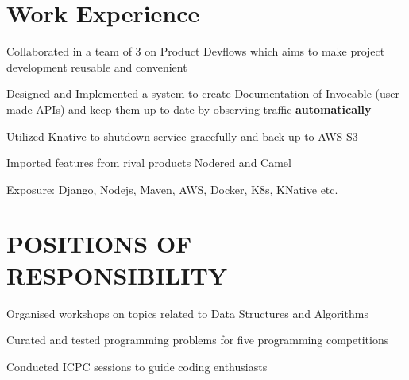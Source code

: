 \documentclass[]{deedy-resume-openfont}
\begin{document}
\hfill
\begin{minipage}[t]{0.66\textwidth} 



\section{Work Experience}
\vspace{\topsep} %
\begin{tightemize}
\item Collaborated in a team of 3 on Product Devflows which aims to make project development reusable and convenient
\item Designed and Implemented a system to create Documentation of Invocable (user-made APIs) and keep them up to date by observing traffic {\bf automatically } 
\item Utilized Knative to shutdown service gracefully and back up to AWS S3
\item Imported features from rival products Nodered and Camel  
\item Exposure: Django, Nodejs, Maven, AWS, Docker, K8s, KNative etc.
\end{tightemize}
\sectionsep

\section{POSITIONS OF RESPONSIBILITY}
\begin{tightemize}
\item Organised workshops on topics related to Data Structures and Algorithms 
\item Curated and tested programming problems for five programming competitions 
\item Conducted ICPC sessions to guide coding enthusiasts
\end{tightemize}
\sectionsep



\end{minipage}
\end{document}
